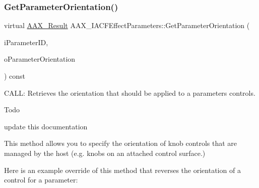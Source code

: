 \subsubsection{\texorpdfstring{GetParameterOrientation()}{GetParameterOrientation()}}
{\footnotesize\ttfamily virtual \mbox{\hyperlink{a00392_a4d8f69a697df7f70c3a8e9b8ee130d2f}{A\+A\+X\+\_\+\+Result}} A\+A\+X\+\_\+\+I\+A\+C\+F\+Effect\+Parameters\+::\+Get\+Parameter\+Orientation (\begin{DoxyParamCaption}\item[{\mbox{\hyperlink{a00392_a1440c756fe5cb158b78193b2fc1780d1}{A\+A\+X\+\_\+\+C\+Param\+ID}}}]{i\+Parameter\+ID,  }\item[{\mbox{\hyperlink{a00491_a52f91d1c14aa5dceedabfb9d2de31bf0}{A\+A\+X\+\_\+\+E\+Parameter\+Orientation}} $\ast$}]{o\+Parameter\+Orientation }\end{DoxyParamCaption}) const\hspace{0.3cm}{\ttfamily [pure virtual]}}



C\+A\+LL\+: Retrieves the orientation that should be applied to a parameter\textquotesingle{}s controls. 

\begin{DoxyRefDesc}{Todo}
\item[\mbox{\hyperlink{a00785__todo000038}{Todo}}]update this documentation\end{DoxyRefDesc}


This method allows you to specify the orientation of knob controls that are managed by the host (e.\+g. knobs on an attached control surface.)

Here is an example override of this method that reverses the orientation of a control for a parameter\+:


\begin{DoxyCode}{0}
\DoxyCodeLine{\textcolor{comment}{// AAX\_IParameter* myBackwardsParameter}}
\DoxyCodeLine{\{}
\DoxyCodeLine{ \}}
\end{DoxyCode}


